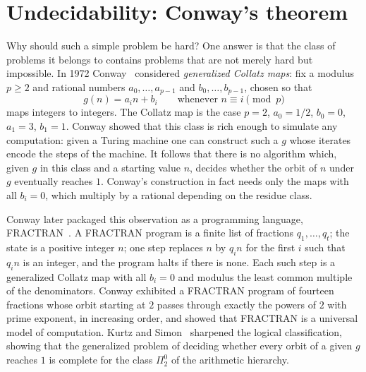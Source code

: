 \section{Undecidability: Conway's theorem}\label{sec:ch1:conway}

Why should such a simple problem be hard? One answer is that the class of
problems it belongs to contains problems that are not merely hard but
impossible. In 1972 Conway~\cite{conway1972} considered \emph{generalized
Collatz maps}: fix a modulus $p\geq2$ and rational numbers $a_0,\ldots,a_{p-1}$
and $b_0,\ldots,b_{p-1}$, chosen so that
\[
  g(n)=a_i n+b_i \qquad\text{whenever } n\equiv i\pmod p
\]
maps integers to integers. The Collatz map is the case $p=2$, $a_0=1/2$,
$b_0=0$, $a_1=3$, $b_1=1$. Conway showed that this class is rich enough to
simulate any computation: given a Turing machine one can construct such a $g$
whose iterates encode the steps of the machine. It follows that there is no
algorithm which, given $g$ in this class and a starting value $n$, decides
whether the orbit of $n$ under $g$ eventually reaches $1$. Conway's
construction in fact needs only the maps with all $b_i=0$, which multiply by a
rational depending on the residue class.

Conway later packaged this observation as a programming language,
FRACTRAN~\cite{conway1987}. A FRACTRAN program is a finite list of fractions
$q_1,\ldots,q_t$; the state is a positive integer $n$; one step replaces $n$ by
$q_i n$ for the first $i$ such that $q_i n$ is an integer, and the program halts
if there is none. Each such step is a generalized Collatz map with all $b_i=0$
and modulus the least common multiple of the denominators. Conway exhibited a
FRACTRAN program of fourteen fractions whose orbit starting at $2$ passes
through exactly the powers of $2$ with prime exponent, in increasing order,
and showed that FRACTRAN is a universal model of computation. Kurtz and
Simon~\cite{kurtz2007} sharpened the logical classification, showing that the
generalized problem of deciding whether every orbit of a given $g$ reaches $1$
is complete for the class $\Pi^0_2$ of the arithmetic hierarchy.

